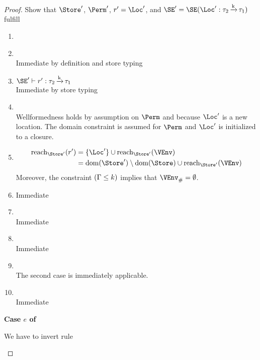 \begin{proof}
  Show that $\Store'$, $\Perm'$, $r' = \Loc'$, and $\SE' = \SE (\Loc'
  : \tau_2\tarr{k}\tau_1)$ fulfill
  \begin{enumerate}[({R}1)]
  \item {}
  \item {} \\
    Immediate by definition and store typing
  \item $\SE' \vdash r' : \tau_2\tarr{k}\tau_1$ \\
    Immediate by store typing
  \item {} \\
    Wellformedness holds by assumption on $\Perm$ and because $\Loc'$ is a new location.
    The domain constraint is assumed for $\Perm$ and $\Loc'$ is
    initialized to a  closure.
  \item {} 
    \begin{align*}
      \Reach{\Store'}{r'} & = \{ \Loc' \} \cup \Reach{\Store'}{\VEnv} \\
      &= \Dom{\Store'}\setminus\Dom\Store \cup \Reach{\Store'}{\VEnv}
    \end{align*}
    Moreover, the constraint ${\Cleq{\E}{k}}$ implies that
    $\Suspended\VEnv = \emptyset$.
  \item {} 
    Immediate
  \item {}   \\
    Immediate
  \item {} \\
    Immediate
  \item {} \\
    The second case is immediately applicable.
  \item {} \\
    Immediate
  \end{enumerate}

  \newpage
  \textbf{Case $e$ of}

  We have to invert rule 
  \begin{mathpar}
  \end{mathpar}


\end{proof}
